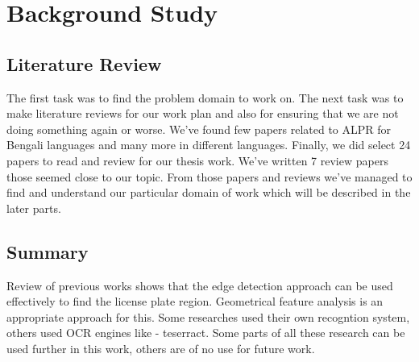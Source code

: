 \documentclass{standalone}
\begin{document}
\chapter{Background Study}





\section{Literature Review}
The first task was to find the problem domain to work on. The next task was to make literature reviews for our work plan and also for ensuring that we are not doing something again or worse. We've found few papers related to ALPR for Bengali languages and many more in different languages. Finally, we did select 24 papers to read and review for our thesis work. We've written 7 review papers those seemed close to our topic. From those papers and reviews we've managed to find and understand our particular domain of work which will be described in the later parts.

  
  
  
  
  
  
  
  
  
\section{Summary}
Review of previous works shows that the edge detection approach can be used effectively to find the license plate region. Geometrical feature analysis is an appropriate approach for this. Some researches used their own recogntion system, others used OCR engines like - teserract. Some parts of all these research can be used further in this work, others are of no use for future work.
\end{document}
